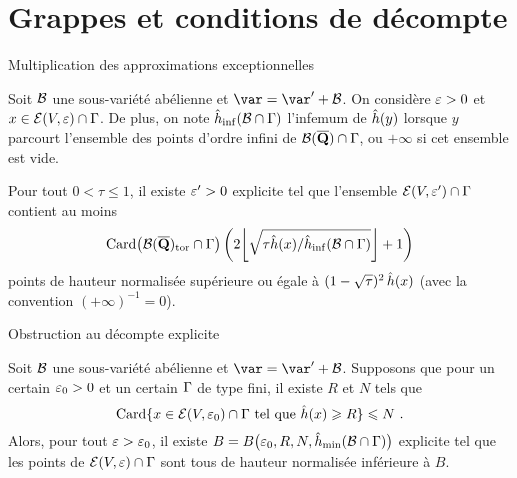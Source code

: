 \documentclass{mpg-thslides}
\begin{document}

\section[Grappes]{Grappes et conditions de décompte}
\tocsect

\begin{frame}{Multiplication des approximations exceptionnelles}
  \begin{prop}
    Soit \( \mathcal B \) une sous-variété abélienne et \( \var = \var' + \vai \).
    On considère \( \varepsilon > 0 \) et \( x \in \mathcal E(V, \varepsilon) \cap \Gamma \).
    De plus, on note \( \hat h_{\mathrm{inf}}(\mathcal B \cap \Gamma) \) l'infemum de \( \hat h (y) \)
    lorsque \( y \) parcourt l'ensemble des points d'ordre infini de
    \( \mathcal B(\overline{{\mathbf{Q}}}) \cap \Gamma \), ou \( +\infty \) si cet ensemble est vide.

    Pour tout \( 0 < \tau \le 1 \), il existe \( \varepsilon' > 0 \) explicite tel que
    l'ensemble \( \mathcal E(V, \varepsilon') \cap \Gamma \) contient au moins
    \begin{equation}
      \card \bigl( \vai(\Qbar)_\torsion \cap \grp \bigr)
      \left(
        2 \floor*{ \sqrt{ \tau \hautn x / \hinf(\vai \cap \grp) } } + 1
      \right)
    \end{equation}
    points de hauteur normalisée supérieure ou égale à
    \( (1-\sqrt\tau)^{2} \, \hat h (x) \) (avec la convention \( (+\infty)^{-1} =
      0 \)).
  \end{prop}
\end{frame}

\begin{frame}{Obstruction au décompte explicite}
  \begin{coro}
    Soit \( \mathcal B \) une sous-variété abélienne et \( \var = \var' + \vai \).
    Supposons que pour un certain \( \varepsilon_0 > 0 \) et un certain \( \Gamma \) de
    type fini, il existe \( R \) et \( N \) tels que
    \begin{equation}
      \operatorname{Card}
      \lbrace
        x \in \mathcal E(V, \varepsilon_0) \cap \Gamma
        \text{ tel que }
        \hat h (x) \geqslant R
      \rbrace
      \leqslant
      N
      \text{ .}
    \end{equation}
    Alors, pour tout \( \varepsilon > \varepsilon_0 \), il existe \( B = B\bigl(\varepsilon_0, R,
      N, \hat h_{\mathrm{min}}(\mathcal B \cap \Gamma)\bigr) \) explicite tel que les points de \(
      \mathcal E(V, \varepsilon) \cap \Gamma \) sont tous de hauteur normalisée
    inférieure à \( B \).
  \end{coro}
\end{frame}
\end{document}
